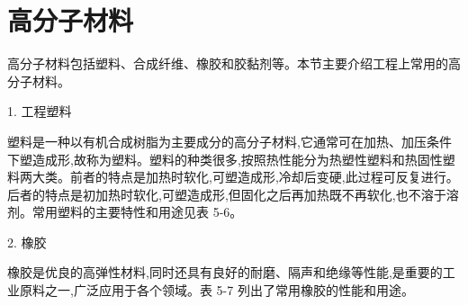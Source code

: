 \documentclass[UTF8]{ctexbook}
\newcommand{\◎}{\ensuremath{\bigcirc}}
\begin{document}
\section{高分子材料}

高分子材料包括塑料、合成纤维、橡胶和胶黏剂等。本节主要介绍工程上常用的高分子材料。

1. 工程塑料

塑料是一种以有机合成树脂为主要成分的高分子材料,它通常可在加热、加压条件下塑造成形,故称为塑料。塑料的种类很多,按照热性能分为热塑性塑料和热固性塑料两大类。前者的特点是加热时软化,可塑造成形,冷却后变硬,此过程可反复进行。后者的特点是初加热时软化,可塑造成形,但固化之后再加热既不再软化,也不溶于溶剂。常用塑料的主要特性和用途见表 5-6。

2. 橡胶

橡胶是优良的高弹性材料,同时还具有良好的耐磨、隔声和绝缘等性能,是重要的工业原料之一,广泛应用于各个领域。表 5-7 列出了常用橡胶的性能和用途。
\end{document}

